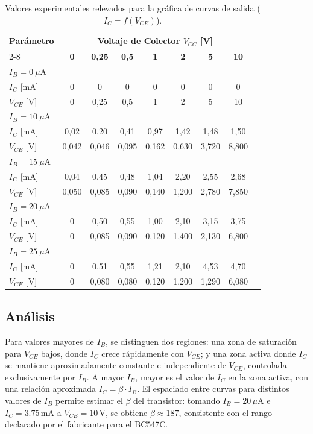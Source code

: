 \documentclass[12pt,a4paper]{article}
\begin{document}
\begin{table}[H]
\centering
\small
\caption{Valores experimentales relevados para la gráfica de curvas de salida ($I_C = f(V_{CE})$).}
\label{tab:curvas_salida_v2}
\begin{tabular}{lcccccccc}
\toprule
\textbf{Parámetro} & \multicolumn{7}{c}{\textbf{Voltaje de Colector $V_{CC}$ [V]}} \\
\cmidrule{2-8}
 & \textbf{0} & \textbf{0,25} & \textbf{0,5} & \textbf{1} & \textbf{2} & \textbf{5} & \textbf{10} \\ \midrule
\textbf{$I_B = 0\ \mu\text{A}$} & & & & & & & \\
$I_C$ [mA] & 0 & 0 & 0 & 0 & 0 & 0 & 0 \\
$V_{CE}$ [V] & 0 & 0,25 & 0,5 & 1 & 2 & 5 & 10 \\ \midrule
\textbf{$I_B = 10\ \mu\text{A}$} & & & & & & & \\
$I_C$ [mA] & 0,02 & 0,20 & 0,41 & 0,97 & 1,42 & 1,48 & 1,50 \\
$V_{CE}$ [V] & 0,042 & 0,046 & 0,095 & 0,162 & 0,630 & 3,720 & 8,800 \\ \midrule
\textbf{$I_B = 15\ \mu\text{A}$} & & & & & & & \\
$I_C$ [mA] & 0,04 & 0,45 & 0,48 & 1,04 & 2,20 & 2,55 & 2,68 \\
$V_{CE}$ [V] & 0,050 & 0,085 & 0,090 & 0,140 & 1,200 & 2,780 & 7,850 \\ \midrule
\textbf{$I_B = 20\ \mu\text{A}$} & & & & & & & \\
$I_C$ [mA] & 0 & 0,50 & 0,55 & 1,00 & 2,10 & 3,15 & 3,75 \\
$V_{CE}$ [V] & 0 & 0,085 & 0,090 & 0,120 & 1,400 & 2,130 & 6,800 \\ \midrule
\textbf{$I_B = 25\ \mu\text{A}$} & & & & & & & \\
$I_C$ [mA] & 0 & 0,51 & 0,55 & 1,21 & 2,10 & 4,53 & 4,70 \\
$V_{CE}$ [V] & 0 & 0,080 & 0,080 & 0,120 & 1,200 & 1,290 & 6,080 \\
\bottomrule
\end{tabular}
\end{table}

\subsection{Análisis}

Para valores mayores de $I_B$, se distinguen dos regiones: una zona de saturación para $V_{CE}$ bajos, donde $I_C$ crece
rápidamente con $V_{CE}$; y una zona activa donde $I_C$ se mantiene aproximadamente constante e independiente de
$V_{CE}$, controlada exclusivamente por $I_B$. A mayor $I_B$, mayor es el valor de $I_C$ en la zona activa, con una
relación aproximada $I_C = \beta \cdot I_B$. El espaciado entre curvas para distintos valores de $I_B$ permite estimar
el $\beta$ del transistor: tomando $I_B = 20\,\mu\text{A}$ e $I_C = 3.75\,\text{mA}$ a $V_{CE} = 10\,\text{V}$, se
obtiene $\beta \approx 187$, consistente con el rango declarado por el fabricante para el BC547C.
\end{document}
